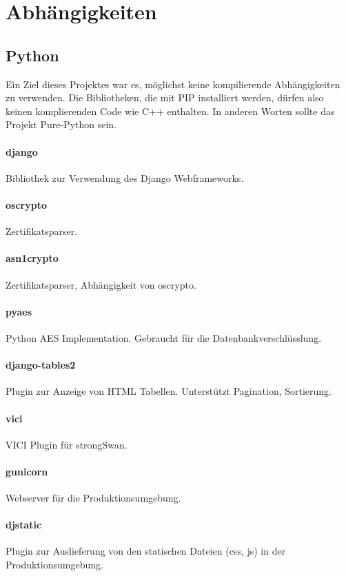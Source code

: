 \section{Abhängigkeiten}

\subsection{Python}
Ein Ziel dieses Projektes war es, möglichst keine kompilierende Abhängigkeiten zu verwenden. Die Bibliotheken, die mit PIP installiert werden, dürfen also keinen komplierenden Code wie C++ enthalten. In anderen Worten sollte das Projekt Pure-Python sein. 

\paragraph{django} \cite{django} Bibliothek zur Verwendung des Django Webframeworks.
\paragraph{oscrypto} \cite{oscrypto} Zertifikatsparser.
\paragraph{asn1crypto} Zertifikatsparser, Abhängigkeit von oscrypto. 
\paragraph{pyaes} \cite{pyaes} Python AES Implementation. Gebraucht für die Datenbankverschlüsslung.
\paragraph{django-tables2} \cite{django-tables} Plugin zur Anzeige von HTML Tabellen. Unterstützt Pagination, Sortierung.
\paragraph{vici} \cite{vici} VICI Plugin für strongSwan.
\paragraph{gunicorn} \cite{gunicorn} Webserver für die Produktionsumgebung.
\paragraph{dj\-static} \cite{dj-static} Plugin zur Auslieferung von den statischen Dateien (css, js) in der Produktionsumgebung.


